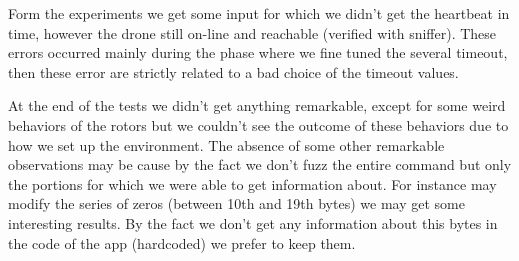 Form the experiments we get some input for which we didn't get the heartbeat in time, however the drone still on-line and reachable (verified with sniffer). These errors occurred mainly during the phase where we fine tuned the several timeout, then these error are strictly related to a bad choice of the timeout values.

At the end of the tests we didn't get anything remarkable, except for some weird behaviors of the rotors but we couldn't see the outcome of these behaviors due to how we set up the environment. The absence of some other remarkable observations may be cause by the fact we don't fuzz the entire command but only the portions for which we were able to get information about. For instance may modify the series of zeros (between 10th and 19th bytes) we may get some interesting results. By the fact we don't get any information about this bytes in the code of the app (hardcoded) we prefer to keep them. 